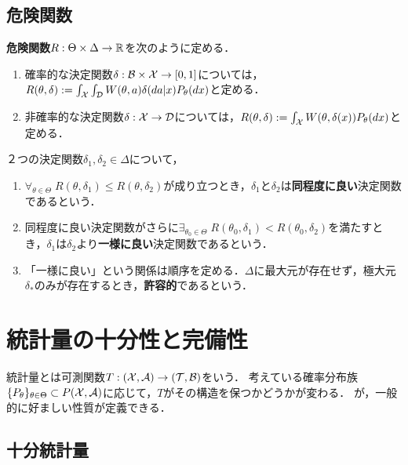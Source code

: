 \documentclass[uplatex,dvipdfmx]{jsreport}
\begin{document}
\subsection{危険関数}

\begin{definition}
    \textbf{危険関数}$R:\Theta\times\Delta\to\mathbb{R}$を次のように定める．
    \begin{enumerate}
        \item 確率的な決定関数$\delta:\mathcal{B}\times\mathcal{X}\to[0,1]$については，$R(\theta,\delta):=\int_{\mathcal{X}}\int_{\mathcal{D}} W(\theta,a)\delta(da|x)P_\theta(dx)$と定める．
        \item 非確率的な決定関数$\delta:\mathcal{X}\to\mathcal{D}$については，$R(\theta,\delta):=\int_{\mathcal{X}} W(\theta,\delta(x))P_\theta(dx)$と定める．
    \end{enumerate}
    ２つの決定関数$\delta_1,\delta_2\in\Delta$について，
    \begin{enumerate}
        \item $\forall_{\theta\in\Theta}\;R(\theta,\delta_1)\le R(\theta,\delta_2)$が成り立つとき，$\delta_1$と$\delta_2$は\textbf{同程度に良い}決定関数であるという．
        \item 同程度に良い決定関数がさらに$\exists_{\theta_0\in\Theta}\;R(\theta_0,\delta_1)<R(\theta_0,\delta_2)$を満たすとき，$\delta_1$は$\delta_2$より\textbf{一様に良い}決定関数であるという．
        \item 「一様に良い」という関係は順序を定める．$\Delta$に最大元が存在せず，極大元$\delta_*$のみが存在するとき，\textbf{許容的}であるという．
    \end{enumerate}
\end{definition}

\section{統計量の十分性と完備性}

\begin{tcolorbox}[colframe=ForestGreen, colback=ForestGreen!10!white,breakable,colbacktitle=ForestGreen!40!white,coltitle=black,fonttitle=\bfseries\sffamily,
title=]
    統計量とは可測関数$T:(\mathcal{X},\mathcal{A})\to(\mathcal{T},\mathcal{B})$をいう．
    考えている確率分布族$\{P_\theta\}_{\theta\in\Theta}\subset P(\mathcal{X},\mathcal{A})$に応じて，$T$がその構造を保つかどうかが変わる．
    が，一般的に好ましい性質が定義できる．
\end{tcolorbox}

\subsection{十分統計量}
\end{document}

